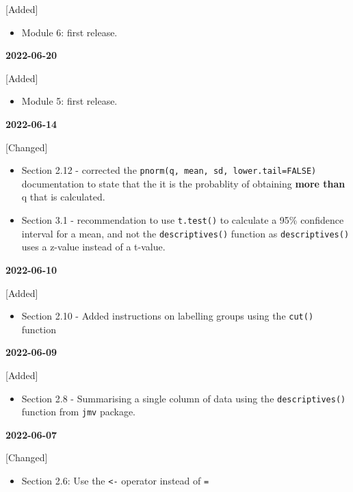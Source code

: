 \documentclass[
]{memoir}
\providecommand{\tightlist}{%
  \setlength{\itemsep}{0pt}\setlength{\parskip}{0pt}}
\begin{document}
{[}Added{]}

\begin{itemize}
\tightlist
\item
  Module 6: first release.
\end{itemize}

\textbf{2022-06-20}

{[}Added{]}

\begin{itemize}
\tightlist
\item
  Module 5: first release.
\end{itemize}

\textbf{2022-06-14}

{[}Changed{]}

\begin{itemize}
\item
  Section 2.12 - corrected the \texttt{pnorm(q,\ mean,\ sd,\ lower.tail=FALSE)} documentation to state that the it is the probablity of obtaining \textbf{more than} q that is calculated.
\item
  Section 3.1 - recommendation to use \texttt{t.test()} to calculate a 95\% confidence interval for a mean, and not the \texttt{descriptives()} function as \texttt{descriptives()} uses a z-value instead of a t-value.
\end{itemize}

\textbf{2022-06-10}

{[}Added{]}

\begin{itemize}
\tightlist
\item
  Section 2.10 - Added instructions on labelling groups using the \texttt{cut()} function
\end{itemize}

\textbf{2022-06-09}

{[}Added{]}

\begin{itemize}
\tightlist
\item
  Section 2.8 - Summarising a single column of data using the \texttt{descriptives()} function from \texttt{jmv} package.
\end{itemize}

\textbf{2022-06-07}

{[}Changed{]}

\begin{itemize}
\tightlist
\item
  Section 2.6: Use the \texttt{\textless{}-} operator instead of \texttt{=}
\end{itemize}
\end{document}
